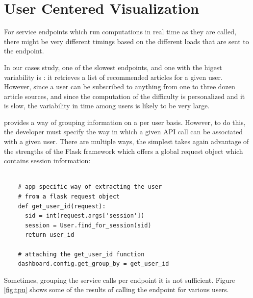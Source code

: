 \documentclass[conference]{IEEEtran}
\begin{document}
\section {User Centered Visualization}

  For service endpoints which run computations in real time as they are called, there might be very different timings based on the different loads that are sent to the endpoint. 

  In our cases study, one of the slowest endpoints, and one with the higest variability is \epFeedItems: it retrieves a list of recommended articles for a given user. However, since a user can be subscribed to anything from one to three dozen article sources, and since the computation of the difficulty is personalized and it is slow, the variability in time among users is likely to be very large. 

  \tool provides a way of grouping information on a per user basis. However, to do this, the developer must specify the way in which a given API call can be associated with a given user. There are multiple ways, the simplest takes again advantage of the strengths of the Flask framework which offers a global request object which contains session information: 

  \begin{lstlisting}[float,caption=TBA,style=custompython]
    
    # app specific way of extracting the user
    # from a flask request object    
    def get_user_id(request):
      sid = int(request.args['session'])
      session = User.find_for_session(sid)
      return user_id

    # attaching the get_user_id function
    dashboard.config.get_group_by = get_user_id

  \end{lstlisting}


  Sometimes, grouping the service calls per endpoint it is not sufficient. Figure \ref{fig:tpu} shows some of the results of calling the \epFeedItems endpoint for various users. 
\end{document}
